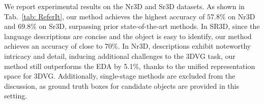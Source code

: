 \documentclass[lettersize,journal]{IEEEtran}
\begin{document}
We report experimental results on the Nr3D and Sr3D datasets.
As shown in Tab.~\textcolor{red}{\ref{tab: ReferIt}}, our method achieves the highest accuracy of $57.8\%$ on Nr3D and $69.8\%$ on Sr3D, surpassing prior state-of-the-art methods.
In SR3D, since the language descriptions are concise and the object is easy to identify, our method achieves an accuracy of close to 70\%.
In Nr3D, descriptions exhibit noteworthy intricacy and detail, inducing additional challenges to the 3DVG task, our method still outperforms the EDA\cite{eda} by 5.1\%, thanks to the unified representation space for 3DVG.
Additionally, single-stage methods are excluded from the discussion, as ground truth boxes for candidate objects are provided in this setting.

\end{document}
